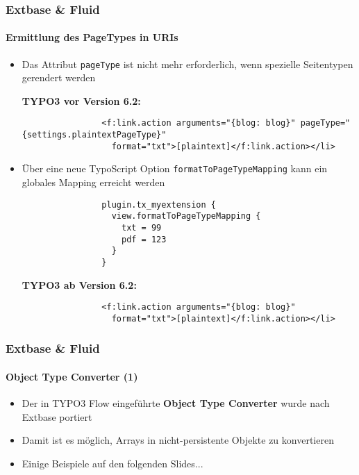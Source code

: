 
\begin{frame}[fragile]
	\frametitle{Extbase \& Fluid}
	\framesubtitle{Ermittlung des PageTypes in URIs}

	\lstset{
		basicstyle=\tiny\ttfamily
	}

	\begin{itemize}
		\item Das Attribut \texttt{pageType} ist nicht mehr erforderlich, wenn spezielle Seitentypen gerendert werden

			\smaller\textbf{TYPO3 vor Version 6.2:}\normalsize
			\begin{lstlisting}
				<f:link.action arguments="{blog: blog}" pageType="{settings.plaintextPageType}"
				  format="txt">[plaintext]</f:link.action></li>
			\end{lstlisting}

		\item Über eine neue TypoScript Option \texttt{formatToPageTypeMapping} kann ein globales Mapping erreicht werden

			\begin{lstlisting}
				plugin.tx_myextension {
				  view.formatToPageTypeMapping {
				    txt = 99
				    pdf = 123
				  }
				}
			\end{lstlisting}

			\smaller\textbf{TYPO3 ab Version 6.2:}\normalsize
			\begin{lstlisting}
				<f:link.action arguments="{blog: blog}"
				  format="txt">[plaintext]</f:link.action></li>
			\end{lstlisting}

	\end{itemize}

\end{frame}


\begin{frame}[fragile]
	\frametitle{Extbase \& Fluid}
	\framesubtitle{Object Type Converter (1)}

	\begin{itemize}
		\item Der in TYPO3 Flow eingeführte \textbf{Object Type Converter} wurde nach Extbase portiert
		\item Damit ist es möglich, Arrays in nicht-persistente Objekte zu konvertieren
		\item Einige Beispiele auf den folgenden Slides...
	\end{itemize}

\end{frame}

